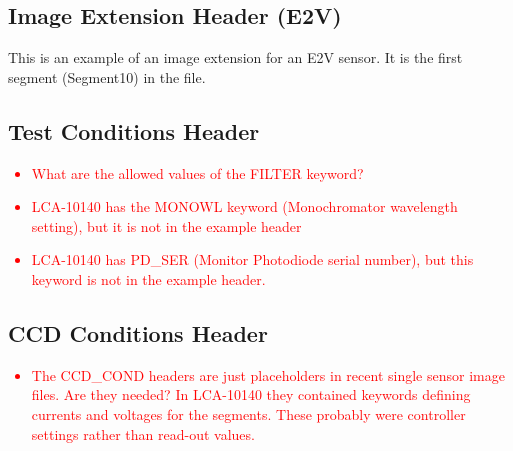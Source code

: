 \documentclass{article}[12pt]
\newcommand{\red}{\textcolor{red}}
\begin{document}
\begin{alltt}

\end{alltt}

\subsection{Image Extension Header (E2V)}

This is an example of an image extension for an E2V sensor.  It is the first segment (Segment10) in the file.

\begin{alltt}

\end{alltt}

\subsection{Test Conditions Header}

\red{
\begin{itemize}
\item{What are the allowed values of the FILTER keyword?}
\item{LCA-10140 has the MONOWL keyword (Monochromator wavelength setting), but it is not in the example header}
\item{LCA-10140 has PD\_SER (Monitor Photodiode serial number), but this keyword is not in the example header.}
\end{itemize}
}

\begin{alltt}

\end{alltt}

\subsection{CCD Conditions Header}

\red{
\begin{itemize}
\item{The CCD\_COND headers are just placeholders in recent single sensor image files.  Are they needed?  In LCA-10140 they contained keywords defining currents and voltages for the segments.  These probably were controller settings rather than read-out values.}
\end{itemize}
}

\begin{alltt}

\end{alltt}
\end{document}
